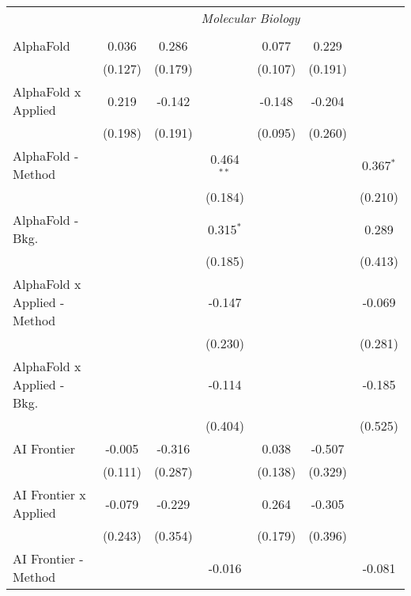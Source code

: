 \begin{tabular}{lcccccc}
 & \multicolumn{6}{c}{\textit{Molecular Biology}} \\ \\
   AlphaFold                      & 0.036   & 0.286   &               & 0.077        & 0.229   &   \\   
                                  & (0.127) & (0.179) &               & (0.107)      & (0.191) &   \\   
   AlphaFold x Applied            & 0.219   & -0.142  &               & -0.148       & -0.204  &   \\   
                                  & (0.198) & (0.191) &               & (0.095)      & (0.260) &   \\   
   AlphaFold - Method             &         &         & 0.464$^{**}$  &              &         & 0.367$^{*}$\\   
                                  &         &         & (0.184)       &              &         & (0.210)\\   
   AlphaFold - Bkg.               &         &         & 0.315$^{*}$   &              &         & 0.289\\   
                                  &         &         & (0.185)       &              &         & (0.413)\\   
   AlphaFold x Applied - Method   &         &         & -0.147        &              &         & -0.069\\   
                                  &         &         & (0.230)       &              &         & (0.281)\\   
   AlphaFold x Applied - Bkg.     &         &         & -0.114        &              &         & -0.185\\   
                                  &         &         & (0.404)       &              &         & (0.525)\\   
   AI Frontier                    & -0.005  & -0.316  &               & 0.038        & -0.507  &   \\   
                                  & (0.111) & (0.287) &               & (0.138)      & (0.329) &   \\   
   AI Frontier x Applied          & -0.079  & -0.229  &               & 0.264        & -0.305  &   \\   
                                  & (0.243) & (0.354) &               & (0.179)      & (0.396) &   \\   
   AI Frontier - Method           &         &         & -0.016        &              &         & -0.081\\   

\end{tabular}
